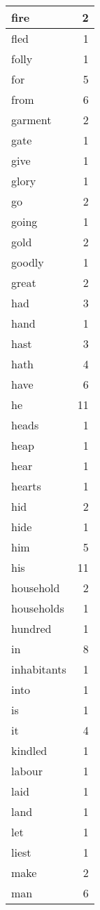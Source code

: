 \begin{center}
\begin{longtable}{l|r}
fire & 2\\ \hline 
fled & 1\\ \hline 
folly & 1\\ \hline 
for & 5\\ \hline 
from & 6\\ \hline 
garment & 2\\ \hline 
gate & 1\\ \hline 
give & 1\\ \hline 
glory & 1\\ \hline 
go & 2\\ \hline 
going & 1\\ \hline 
gold & 2\\ \hline 
goodly & 1\\ \hline 
great & 2\\ \hline 
had & 3\\ \hline 
hand & 1\\ \hline 
hast & 3\\ \hline 
hath & 4\\ \hline 
have & 6\\ \hline 
he & 11\\ \hline 
heads & 1\\ \hline 
heap & 1\\ \hline 
hear & 1\\ \hline 
hearts & 1\\ \hline 
hid & 2\\ \hline 
hide & 1\\ \hline 
him & 5\\ \hline 
his & 11\\ \hline 
household & 2\\ \hline 
households & 1\\ \hline 
hundred & 1\\ \hline 
in & 8\\ \hline 
inhabitants & 1\\ \hline 
into & 1\\ \hline 
is & 1\\ \hline 
it & 4\\ \hline 
kindled & 1\\ \hline 
labour & 1\\ \hline 
laid & 1\\ \hline 
land & 1\\ \hline 
let & 1\\ \hline 
liest & 1\\ \hline 
make & 2\\ \hline 
man & 6\\ \hline 

\end{longtable}
\end{center}

